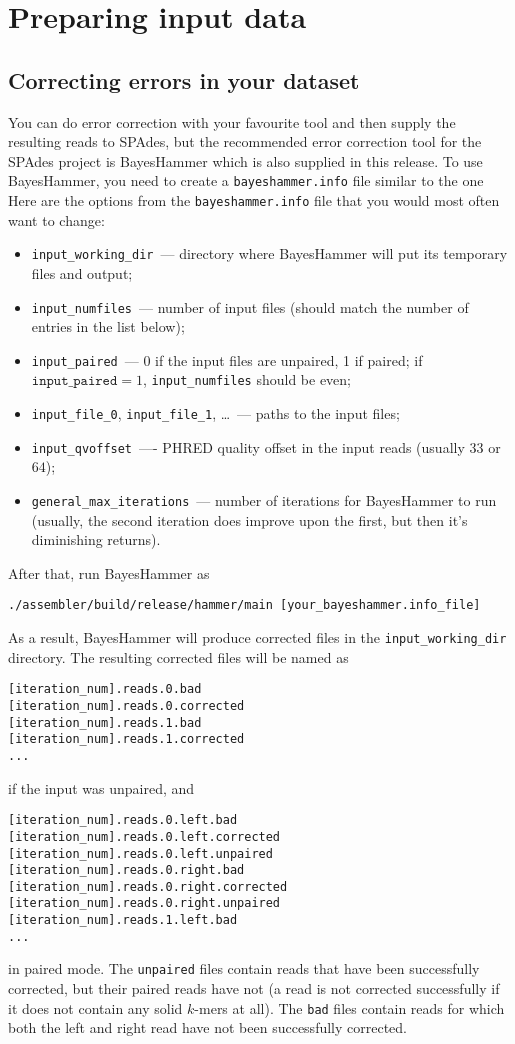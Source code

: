 \documentclass{article}
\def\spades{SPAdes}
\def\bh{BayesHammer}
\begin{document}
\section{Preparing input data}
\subsection{Correcting errors in your dataset}\label{subsec:bh}
You can do error correction with your favourite tool and then supply the resulting reads to {\spades}, but the recommended error correction tool for
the {\spades} project is {\bh} which is also supplied in this release. To use {\bh}, you need to create a {\tt bayeshammer.info} file similar to the one
Here are the options from the {\tt bayeshammer.info} file that you would most often want to change:
\begin{itemize}
\item \verb$input_working_dir$~--- directory where BayesHammer will put its temporary files and output;
\item \verb$input_numfiles$~--- number of input files (should match the number of entries in the list below);
\item \verb$input_paired$~--- $0$ if the input files are unpaired, 1 if paired; if $\texttt{input\_paired}=1$, \verb$input_numfiles$ should be even;
\item \verb$input_file_0$, \verb$input_file_1$, \ldots ~--- paths to the input files;
\item \verb$input_qvoffset$~---- PHRED quality offset in the input reads (usually $33$ or $64$);
\item \verb$general_max_iterations$~--- number of iterations for {\bh} to run (usually, the second iteration does improve upon the first, but then it's
diminishing returns).
\end{itemize}

After that, run {\bh} as
\begin{verbatim}
./assembler/build/release/hammer/main [your_bayeshammer.info_file]
\end{verbatim}

As a result, {\bh} will produce corrected files in the \verb$input_working_dir$ directory. The resulting corrected files will be named as
\begin{verbatim}
[iteration_num].reads.0.bad
[iteration_num].reads.0.corrected
[iteration_num].reads.1.bad
[iteration_num].reads.1.corrected
...
\end{verbatim}
if the input was unpaired, and
\begin{verbatim}
[iteration_num].reads.0.left.bad
[iteration_num].reads.0.left.corrected
[iteration_num].reads.0.left.unpaired
[iteration_num].reads.0.right.bad
[iteration_num].reads.0.right.corrected
[iteration_num].reads.0.right.unpaired
[iteration_num].reads.1.left.bad
...
\end{verbatim}
in paired mode. The \verb$unpaired$ files contain reads that have been successfully corrected, but their paired reads have not
(a read is not corrected successfully if it does not contain any solid $k$-mers at all). The \verb$bad$ files contain reads for which
both the left and right read have not been successfully corrected.
\end{document}
